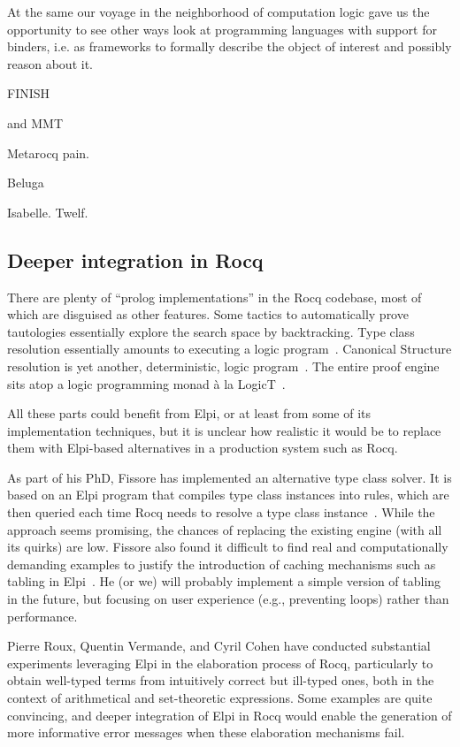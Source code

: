 \documentclass[a4paper, 11pt]{book}
\begin{document}
At the same our voyage in the neighborhood of computation logic
gave us the opportunity to see other ways look at programming
languages with support for binders, i.e. as frameworks to formally
describe the object of interest and possibly reason about it.

FINISH

 and
MMT~\cite{RABE20131}


Metarocq pain.

Beluga\cite{DBLP:conf/cade/PientkaC15,10.1007/978-3-642-12251-4_1}

Isabelle.
 Twelf.


\subsection{Deeper integration in Rocq}

There are plenty of ``prolog implementations'' in the Rocq codebase, most of
which are disguised as other features. Some tactics to automatically prove
tautologies essentially explore the search space by backtracking. Type class
resolution essentially amounts to executing a logic program~\cite{fctc}.
Canonical Structure resolution is yet another, deterministic, logic
program~\cite{tassi13}. The entire proof engine sits atop a logic programming
monad à la LogicT~\cite{logicT}.

All these parts could benefit from Elpi, or at least from some of its
implementation techniques, but it is unclear how realistic it would be to
replace them with Elpi-based alternatives in a production system such as Rocq.

As part of his PhD, Fissore has implemented an alternative type class solver.
It is based on an Elpi program that compiles type class instances into rules,
which are then queried each time Rocq needs to resolve a type class
instance~\cite{newtc,unifforfree}. While the approach seems promising, the
chances of replacing the existing engine (with all its quirks) are low. Fissore
also found it difficult to find real and computationally demanding examples to
justify the introduction of caching mechanisms such as tabling in
Elpi~\cite{selsam2020tabledtypeclassresolution,brigittePHD}. He (or we) will
probably implement a simple version of tabling in the future, but focusing on
user experience (e.g., preventing loops) rather than performance.

Pierre Roux, Quentin Vermande, and Cyril Cohen have conducted substantial
experiments leveraging Elpi in the elaboration process of Rocq, particularly to
obtain well-typed terms from intuitively correct but ill-typed ones, both in
the context of arithmetical and set-theoretic expressions. Some examples are
quite convincing, and deeper integration of Elpi in Rocq would enable the
generation of more informative error messages when these elaboration mechanisms
fail.
\end{document}
